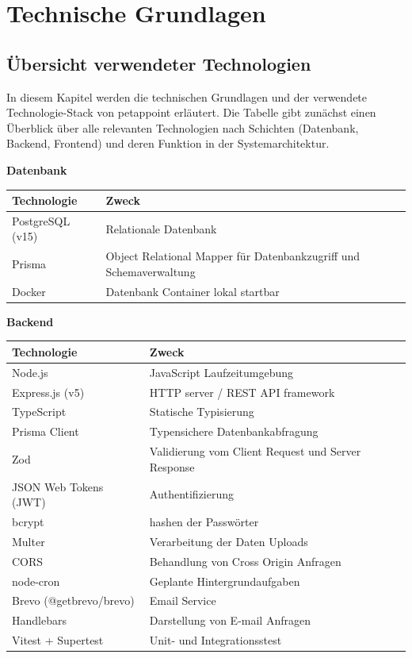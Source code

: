 \chapter{Technische Grundlagen}

\section{Übersicht verwendeter Technologien}

In diesem Kapitel werden die technischen Grundlagen und der verwendete Technologie-Stack von petappoint erläutert. Die Tabelle gibt zunächst einen Überblick über alle relevanten Technologien nach Schichten (Datenbank, Backend, Frontend) und deren Funktion in der Systemarchitektur. 

\textbf{Datenbank}

\begin{tabular}{|p{5cm}|p{}|}
\hline
\textbf{Technologie} & \textbf{Zweck} \\
\hline
PostgreSQL (v15) & Relationale Datenbank \\
\hline
Prisma & Object Relational Mapper für Datenbankzugriff und Schemaverwaltung \\
\hline
Docker & Datenbank Container lokal startbar \\
\hline
\end{tabular}

\vspace{1em}

\textbf{Backend}

\begin{tabular}{|p{5cm}|p{}|}
\hline
\textbf{Technologie} & \textbf{Zweck} \\
\hline
Node.js & JavaScript Laufzeitumgebung \\
\hline
Express.js (v5) & HTTP server / REST API framework \\
\hline
TypeScript & Statische Typisierung \\
\hline
Prisma Client & Typensichere Datenbankabfragung \\
\hline
Zod & Validierung vom Client Request und Server Response \\
\hline
JSON Web Tokens (JWT) & Authentifizierung \\
\hline
bcrypt & hashen der Passwörter  \\
\hline
Multer & Verarbeitung der Daten Uploads \\
\hline
CORS & Behandlung von Cross Origin Anfragen \\
\hline
node-cron & Geplante Hintergrundaufgaben \\
\hline
Brevo (@getbrevo/brevo) & Email Service \\
\hline
Handlebars & Darstellung von E-mail Anfragen \\
\hline
Vitest + Supertest & Unit- und Integrationsstest \\
\hline
\end{tabular}

